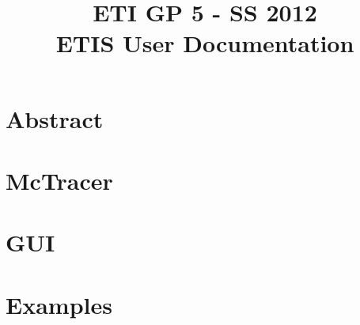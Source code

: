 \documentclass{scrartcl}
\title{ETI GP 5 - SS 2012\\ETIS User Documentation}
\begin{document}
\maketitle
\tableofcontents
\newpage

\section{Abstract} 
\newpage
\section{McTracer} 
\newpage
\section{GUI} 
\newpage
\section{Examples} 
\end{document}
